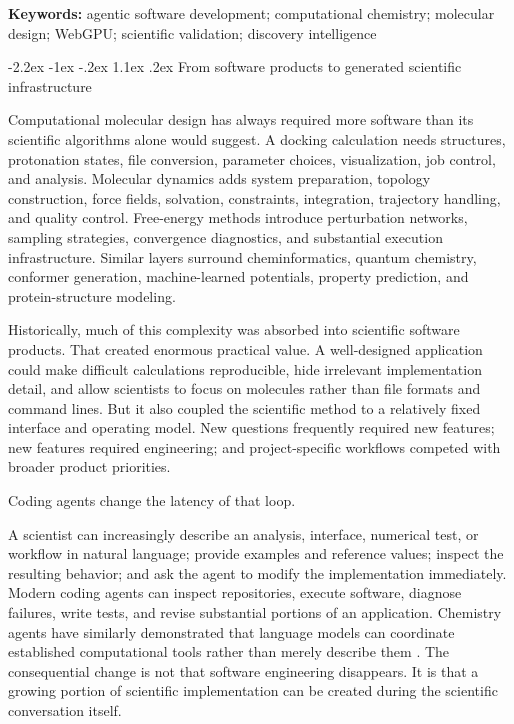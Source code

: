\documentclass[11pt]{article}
\makeatletter
\renewcommand\section{\@startsection{section}{1}{\z@}%
  {-2.2ex \@plus -1ex \@minus -.2ex}%
  {1.1ex \@plus .2ex}%
  {\normalfont\Large\bfseries\color{molblue}}}
\makeatother
\begin{document}
\textbf{Keywords:} agentic software development; computational chemistry; molecular design; WebGPU; scientific validation; discovery intelligence

\section{From software products to generated scientific infrastructure}

Computational molecular design has always required more software than its scientific algorithms alone would suggest. A docking calculation needs structures, protonation states, file conversion, parameter choices, visualization, job control, and analysis. Molecular dynamics adds system preparation, topology construction, force fields, solvation, constraints, integration, trajectory handling, and quality control. Free-energy methods introduce perturbation networks, sampling strategies, convergence diagnostics, and substantial execution infrastructure. Similar layers surround cheminformatics, quantum chemistry, conformer generation, machine-learned potentials, property prediction, and protein-structure modeling.

Historically, much of this complexity was absorbed into scientific software products. That created enormous practical value. A well-designed application could make difficult calculations reproducible, hide irrelevant implementation detail, and allow scientists to focus on molecules rather than file formats and command lines. But it also coupled the scientific method to a relatively fixed interface and operating model. New questions frequently required new features; new features required engineering; and project-specific workflows competed with broader product priorities.

Coding agents change the latency of that loop.

A scientist can increasingly describe an analysis, interface, numerical test, or workflow in natural language; provide examples and reference values; inspect the resulting behavior; and ask the agent to modify the implementation immediately. Modern coding agents can inspect repositories, execute software, diagnose failures, write tests, and revise substantial portions of an application. Chemistry agents have similarly demonstrated that language models can coordinate established computational tools rather than merely describe them \citep{bran2024chemcrow,boiko2023coscientist}. The consequential change is not that software engineering disappears. It is that a growing portion of scientific implementation can be created during the scientific conversation itself.
\end{document}
